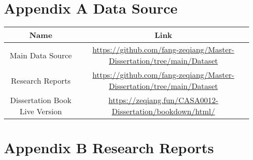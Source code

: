 \documentclass[
  12pt,
  oneside]{book}
\begin{document}
\printbibliography

\hypertarget{appendix-a-data-source}{%
\chapter*{Appendix A Data Source}\label{appendix-a-data-source}}


\begin{longtable}[]{@{}cc@{}}
\toprule
\begin{minipage}[b]{0.47\columnwidth}\centering
Name\strut
\end{minipage} & \begin{minipage}[b]{0.47\columnwidth}\centering
Link\strut
\end{minipage}\tabularnewline
\midrule
\endhead
\begin{minipage}[t]{0.47\columnwidth}\centering
Main Data Source\strut
\end{minipage} & \begin{minipage}[t]{0.47\columnwidth}\centering
\url{https://github.com/fang-zeqiang/Master-Dissertation/tree/main/Dataset}\strut
\end{minipage}\tabularnewline
\begin{minipage}[t]{0.47\columnwidth}\centering
Research Reports\strut
\end{minipage} & \begin{minipage}[t]{0.47\columnwidth}\centering
\url{https://github.com/fang-zeqiang/Master-Dissertation/tree/main/Dataset}\strut
\end{minipage}\tabularnewline
\begin{minipage}[t]{0.47\columnwidth}\centering
Dissertation Book Live Version\strut
\end{minipage} & \begin{minipage}[t]{0.47\columnwidth}\centering
\url{https://zeqiang.fun/CASA0012-Dissertation/bookdown/html/}\strut
\end{minipage}\tabularnewline
\bottomrule
\end{longtable}

\hypertarget{appendix-b-research-reports}{%
\chapter*{Appendix B Research Reports}\label{appendix-b-research-reports}}
\end{document}
